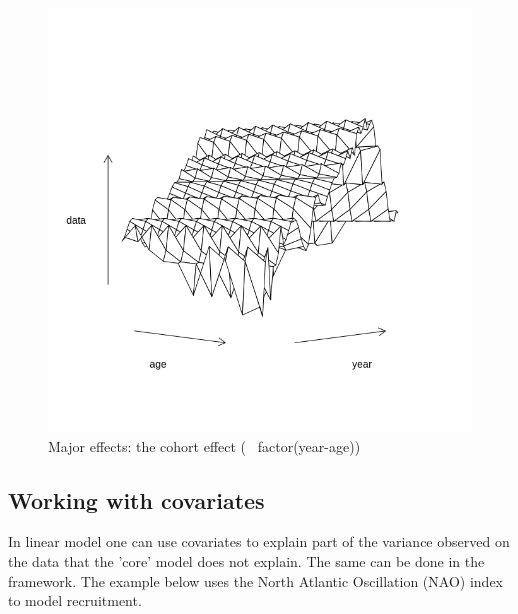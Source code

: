 \documentclass[a4paper,english,10pt]{article}\usepackage[]{graphicx}\usepackage[]{color}
\newenvironment{knitrout}{}{} %
\begin{document}
\begin{knitrout}
\color{fgcolor}\begin{figure}[H]

{\centering \includegraphics[width=.9\linewidth]{figure/majeffc-1} 

}

\caption[Major effects]{Major effects: the cohort effect (~ factor(year-age))}\label{fig:majeffc}
\end{figure}


\end{knitrout}

\subsection{Working with covariates}

In linear model one can use covariates to explain part of the variance observed on the data that the 'core' model does not explain. The same can be done in the \aFa framework. The example below uses the North Atlantic Oscillation (NAO) index to model recruitment.
\end{document}
